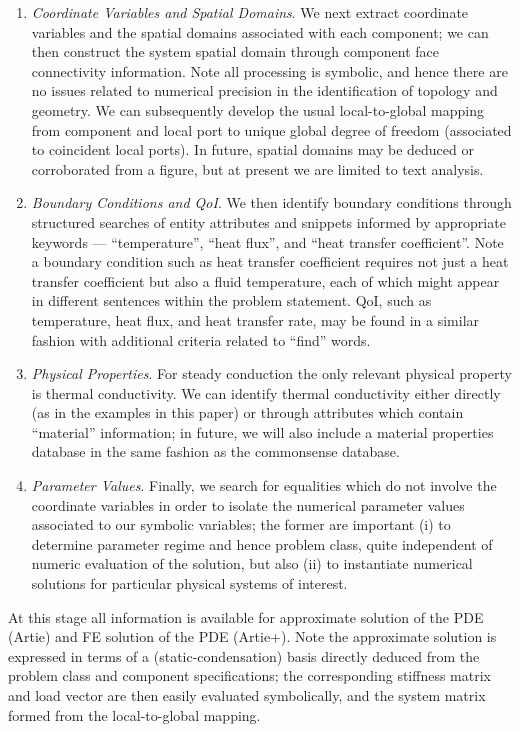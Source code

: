 \documentclass[preprint,12pt]{article}
\begin{document}
\begin{enumerate}
\item {\em Coordinate Variables and Spatial Domains}. We next extract coordinate variables and the spatial domains associated with each component; we can then construct the system spatial domain through component face connectivity information. Note all processing is symbolic, and hence there are no issues related to numerical precision in the identification of topology and geometry. We can subsequently develop the usual local-to-global mapping from component and local port to unique global degree of freedom (associated to coincident local ports). In future, spatial domains may be deduced or corroborated from a figure, but at present we are limited to text analysis.

\item {\em Boundary Conditions and QoI}. We then identify boundary conditions  through structured searches of entity attributes and snippets informed by appropriate keywords --- ``temperature'', ``heat flux'', and ``heat transfer coefficient''. Note a boundary condition such as heat transfer coefficient requires not just a heat transfer coefficient but also a fluid temperature, each of which might appear in different sentences within the problem statement.  QoI, such as temperature, heat flux, and heat transfer rate, may be found in a similar fashion with additional criteria related to ``find'' words.

\item {\em Physical Properties}. For steady conduction the only relevant physical property is thermal conductivity. We can identify thermal conductivity either directly (as in the examples in this paper) or through attributes which contain ``material'' information; in future, we will also include a material properties database in the same fashion as the commonsense database.

\item {\em Parameter Values}. Finally, we search for equalities which do not involve the coordinate variables in order to isolate the numerical parameter values associated to our symbolic variables; the former are important (i) to determine parameter regime and hence problem class, quite independent of numeric evaluation of the solution, but also (ii) to instantiate numerical solutions for particular physical systems of interest. 

\end{enumerate}
At this stage all information is available for approximate solution of the PDE (Artie) and FE solution of the PDE (Artie+). Note the approximate solution is expressed in terms of a (static-condensation) basis directly deduced from the problem class and component specifications; the corresponding stiffness matrix and load vector are then easily evaluated symbolically, and the system matrix formed from the local-to-global mapping. 
\end{document}
